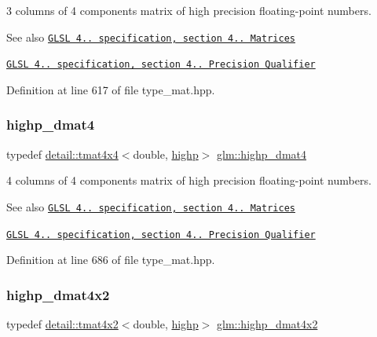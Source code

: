 3 columns of 4 components matrix of high precision floating-\/point numbers.

\begin{DoxySeeAlso}{See also}
\href{http://www.opengl.org/registry/doc/GLSLangSpec.4.20.8.pdf}{\tt G\+L\+SL 4.. specification, section 4.. Matrices} 

\href{http://www.opengl.org/registry/doc/GLSLangSpec.4.20.8.pdf}{\tt G\+L\+SL 4.. specification, section 4.. Precision Qualifier} 
\end{DoxySeeAlso}


Definition at line 617 of file type\+\_\+mat.\+hpp.

\mbox{\label{group__core__precision_ga9a5d95e476d451d28d3939ac7f124baf}} 
\subsubsection{\texorpdfstring{highp\+\_\+dmat4}{highp\_dmat4}}
{\footnotesize\ttfamily typedef \hyperlink{structglm_1_1detail_1_1tmat4x4}{detail\+::tmat4x4}$<$double, \hyperlink{namespaceglm_a0f04f086094c747d227af4425893f545ac6f7eab42eacbb10d59a58e95e362074}{highp}$>$ \hyperlink{group__core__precision_ga9a5d95e476d451d28d3939ac7f124baf}{glm\+::highp\+\_\+dmat4}}

4 columns of 4 components matrix of high precision floating-\/point numbers.

\begin{DoxySeeAlso}{See also}
\href{http://www.opengl.org/registry/doc/GLSLangSpec.4.20.8.pdf}{\tt G\+L\+SL 4.. specification, section 4.. Matrices} 

\href{http://www.opengl.org/registry/doc/GLSLangSpec.4.20.8.pdf}{\tt G\+L\+SL 4.. specification, section 4.. Precision Qualifier} 
\end{DoxySeeAlso}


Definition at line 686 of file type\+\_\+mat.\+hpp.

\mbox{\label{group__core__precision_gaa4fb1ed350a6cd053abb9b093d13ce0d}} 
\subsubsection{\texorpdfstring{highp\+\_\+dmat4x2}{highp\_dmat4x2}}
{\footnotesize\ttfamily typedef \hyperlink{structglm_1_1detail_1_1tmat4x2}{detail\+::tmat4x2}$<$double, \hyperlink{namespaceglm_a0f04f086094c747d227af4425893f545ac6f7eab42eacbb10d59a58e95e362074}{highp}$>$ \hyperlink{group__core__precision_gaa4fb1ed350a6cd053abb9b093d13ce0d}{glm\+::highp\+\_\+dmat4x2}}

